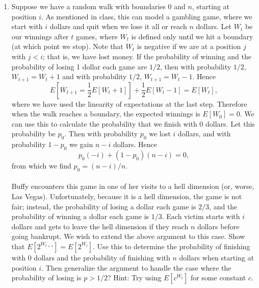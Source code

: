 \documentclass[tikz, 12pt]{scrartcl}
\begin{document}
\begin{enumerate}
	\item Suppose we have a random walk with boundaries 0 and $n$, starting at position $i$. As mentioned in class, this can model a gambling game, where we start with $i$ dollars and quit when we lose it all or reach $n$ dollars. Let $W_t$ be our winnings after $t$ games, where $W_t$ is defined only until we hit a boundary (at which point we stop). Note that $W_t$ is negative if we are at a position $j$ with $j < i$; that is, we have lost money. If the probability of winning and the probability of losing 1 dollar each game are $1/2$, then with probability $1/2$, $W_{t + 1} = W_t + 1$ and with probability $1/2$, $W_{t+1} = W_t - 1$. Hence
	\begin{equation}
	E[W_{t + 1} = \frac{1}{2} E[W_{t} + 1]] + \frac{1}{2}E[W_{t} - 1] = E[W_{t}],
	\end{equation}
	where we have used the linearity of expectations at the last step. Therefore when the walk reaches a boundary, the expected winnings is $E[W_0] = 0$. We can use this to calculate the probability that we finish with 0 dollars. Let this probability be $p_0$. Then with probability $p_0$ we lost $i$ dollars, and with probability $1 - p_0$ we gain $n - i$ dollars. Hence
	\begin{equation}
	p_0(-i) + (1 - p_0)(n - i) = 0,
	\end{equation}
	from which we find $p_0  = (n - i) / n$.\\
	\\
	Buffy encounters this game in one of her visits to a hell dimension (or, worse, Las Vegas). Unfortunately, because it is a hell dimension, the game is not fair; instead, the probability of losing a dollar each game is $2/3$, and the probability of winning a dollar each game is $1/3$. Each victim starts with $i$ dollars and gets to leave the hell dimension if they reach $n$ dollars before going bankrupt. We wish to extend the above argument to this case. Show that $E[2^{W_{t+1}}] = E[2^{W_t}]$. Use this to determine the probability of finishing with 0 dollars and the probability of finishing with $n$ dollars when starting at position $i$. Then generalize the argument to handle the case where the probability of losing is $p > 1/2$? Hint: Try using $E[c^{W_t}]$ for some constant $c$.
\end{enumerate}
\end{document}
